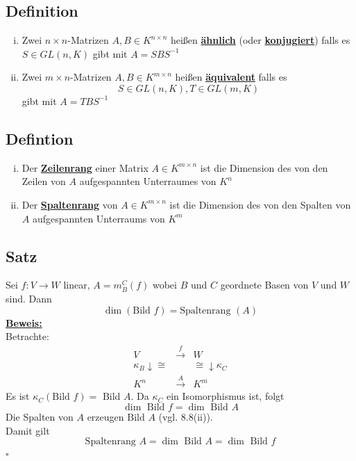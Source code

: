 \subsection{Definition} %
\label{sub:definition}
\begin{enumerate}[(i)]
	\item Zwei $n \times n$-Matrizen $A,B \in K^{n \times n}$ heißen \underline{\textbf{ähnlich}} 
	(oder \underline{\textbf{konjugiert}}) falls es $S \in GL (n, K)$ gibt mit $A=SBS^{-1}$
	\item Zwei $m \times n$-Matrizen $A,B \in K^{m \times n}$ heißen \underline{\textbf{äquivalent}} falls es 
	\[
		S \in GL(n,K), T \in GL(m,K)
	\]
	gibt mit $A=TBS^{-1}$
\end{enumerate}

\subsection{Defintion} %
\label{sub:defintion}
\begin{enumerate}[(i)]
	\item Der \underline{\textbf{Zeilenrang}} einer Matrix $A \in K^{m \times n}$ ist die Dimension des von den Zeilen von $A$ aufgespannten
	Unterraumes von $K^n$
	\item Der \underline{ \textbf{Spaltenrang}} von $A \in K^{m \times n}$ ist die Dimension des von den Spalten von $A$ aufgespannten Unterraums von $K^m$
\end{enumerate}

\subsection{Satz} %
\label{sub:satz}
Sei $f: V \to W$ linear, $A=m_B^C(f)$ wobei $B$ und $C$ geordnete Basen von $V$ und $W$ sind. Dann
\[
	\dim (\text{Bild }f)= \text{Spaltenrang }(A)
\]
\underline{\textbf{Beweis:}} \\
Betrachte: 
\[
	\begin{matrix}
		V & \xrightarrow{f} & W \\
		\kappa_B \downarrow \cong & & \cong \downarrow \kappa_C \\
		K^n & \xrightarrow{A} & K^m
	\end{matrix}
\]
Es ist $\kappa_C (\text{Bild }f)= \text{ Bild }A$. Da $\kappa_C$ ein Isomorphismus ist, folgt 
\[
	\dim \text{ Bild }f = \dim \text{ Bild } A
\]
Die Spalten von $A$ erzeugen $\text{Bild }A$ (vgl. 8.8(ii)). \\
Damit gilt 
\[
	\text{Spaltenrang }A = \dim \text{ Bild } A = \dim \text{ Bild }f
\]
\hfill \( \square \)

